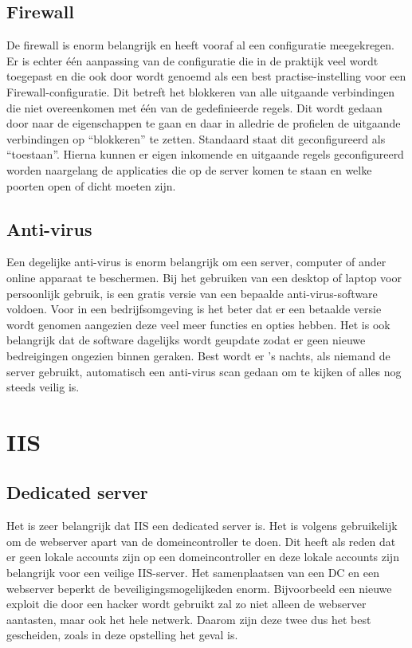 \documentclass[pdftex,a4paper,12pt]{report}
\begin{document}
\subsection{Firewall}
De firewall is enorm belangrijk en heeft vooraf al een configuratie meegekregen. Er is echter één aanpassing van de configuratie die in de praktijk veel wordt toegepast en die ook door \cite{Nabors2013} wordt genoemd als een best practise-instelling voor een Firewall-configuratie. Dit betreft het blokkeren van alle uitgaande verbindingen die niet overeenkomen met één van de gedefinieerde regels. Dit wordt gedaan door naar de eigenschappen te gaan en daar in alledrie de profielen de uitgaande verbindingen op "`blokkeren"' te zetten. Standaard staat dit geconfigureerd als "`toestaan"'. Hierna kunnen er eigen inkomende en uitgaande regels geconfigureerd worden naargelang de applicaties die op de server komen te staan en welke poorten open of dicht moeten zijn.

\subsection{Anti-virus}
Een degelijke anti-virus is enorm belangrijk om een server, computer of ander online apparaat te beschermen. Bij het gebruiken van een desktop of laptop voor persoonlijk gebruik, is een gratis versie van een bepaalde anti-virus-software voldoen. Voor in een bedrijfsomgeving is het beter dat er een betaalde versie wordt genomen aangezien deze veel meer functies en opties hebben. Het is ook belangrijk dat de software dagelijks wordt geupdate zodat er geen nieuwe bedreigingen ongezien binnen geraken. Best wordt er 's nachts, als niemand de server gebruikt, automatisch een anti-virus scan gedaan om te kijken of alles nog steeds veilig is.

\section{IIS}
\subsection{Dedicated server}
Het is zeer belangrijk dat IIS een dedicated server is. Het is volgens \cite{Microsoft2013} gebruikelijk om de webserver apart van de domeincontroller te doen. Dit heeft als reden dat er geen lokale accounts zijn op een domeincontroller en deze lokale accounts zijn belangrijk voor een veilige IIS-server. Het samenplaatsen van een DC en een webserver beperkt de beveiligingsmogelijkeden enorm. Bijvoorbeeld een nieuwe exploit die door een hacker wordt gebruikt zal zo niet alleen de webserver aantasten, maar ook het hele netwerk. Daarom zijn deze twee dus het best gescheiden, zoals in deze opstelling het geval is.
\end{document}

